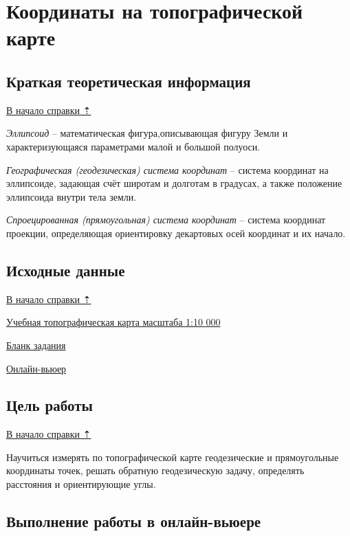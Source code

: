 \documentclass[
  12pt,
]{book}
\begin{document}
\chapter{Координаты на топографической карте}\label{coordinates}

\section{Краткая теоретическая информация}\label{coordinates-theory}

\hyperref[coordinates]{В начало справки ⇡}

\emph{Эллипсоид} -- математическая фигура,описывающая фигуру Земли и характеризующаяся параметрами малой и большой полуоси.

\emph{Географическая (геодезическая) система координат} -- система координат на эллипсоиде, задающая счёт широтам и долготам в градусах, а также положение эллипсоида внутри тела земли.

\emph{Спроецированная (прямоугольная) система координат} -- система координат проекции, определяющая ориентировку декартовых осей координат и их начало.

\section{Исходные данные}\label{coordinates-data}

\hyperref[coordinates]{В начало справки ⇡}

\href{https://disk.yandex.ru/i/6OLWDuRwV85cuA}{Учебная топографическая карта масштаба 1:10 000}

\href{https://disk.yandex.ru/i/UrzUS6kVB7vwgg}{Бланк задания}

\href{https://autode.sk/31q2BNi}{Онлайн-вьюер}

\section{Цель работы}\label{coordinates-task}

\hyperref[coordinates]{В начало справки ⇡}

Научиться измерять по топографической карте геодезические и прямоугольные координаты точек, решать обратную геодезическую задачу, определять расстояния и ориентирующие углы.

\section{Выполнение работы в онлайн-вьюере}\label{coordinates-workflow}
\end{document}
